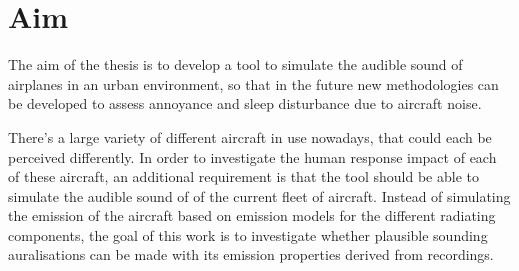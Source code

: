 %
%
%
%
%
%
%
%


\newpage
\section{Aim}


The aim of the thesis is to develop a tool to simulate the audible sound of
airplanes in an urban environment, so that in the future new methodologies can be
developed to assess annoyance and sleep disturbance due to aircraft noise.

There's a large variety of different aircraft in use nowadays, that could each
be perceived differently. In order to investigate the human response impact of
each of these aircraft, an additional requirement is that the tool should be
able to simulate the audible sound of of the current fleet of aircraft. Instead
of simulating the emission of the aircraft based on emission models for the
different radiating components, the goal of this work is to investigate whether
plausible sounding auralisations can be made with its emission properties
derived from recordings.

